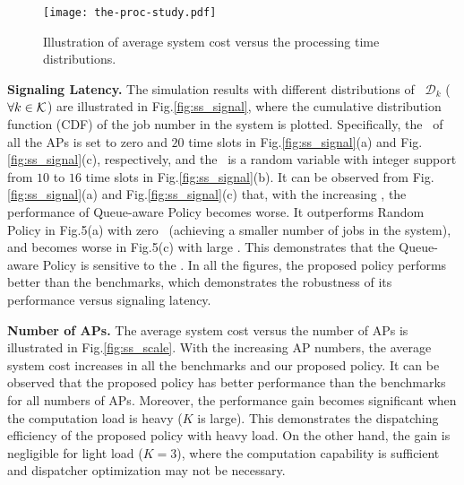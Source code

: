 \begin{figure}[hbt]                                                 %
    \centering                                                      %
    \texttt{[image: the-proc-study.pdf]}      %
    \caption{Illustration of average system cost versus the processing time distributions.}
    \label{fig:ss_dist}                                             %
\end{figure}                                                        %


\textbf{Signaling Latency.}
The simulation results with different distributions of \brlatency~$\mathcal{D}_{k}$ ($\forall k\in\mathcal{K}$) are illustrated in Fig.\ref{fig:ss_signal}, where the cumulative distribution function (CDF) of the job number in the system is plotted.
Specifically, the \brlatency~of all the APs is set to zero and $20$ time slots in Fig.\ref{fig:ss_signal}(a) and Fig.\ref{fig:ss_signal}(c), respectively, and the \brlatency~is a random variable with integer support from $10$ to $16$ time slots in Fig.\ref{fig:ss_signal}(b).
It can be observed from Fig.\ref{fig:ss_signal}(a) and Fig.\ref{fig:ss_signal}(c) that, with the increasing \brlatency, the performance of Queue-aware Policy becomes worse.
It outperforms Random Policy in Fig.5(a) with zero \brlatency~(achieving a smaller number of jobs in the system), and becomes worse in Fig.5(c) with large \brlatency.
This demonstrates that the Queue-aware Policy is sensitive to the \brlatency.
In all the figures, the proposed policy performs better than the benchmarks, which demonstrates the robustness of its performance versus signaling latency.

\textbf{Number of APs.} %
The average system cost versus the number of APs is illustrated in Fig.\ref{fig:ss_scale}.
With the increasing AP numbers, the average system cost increases in all the benchmarks and our proposed policy.
It can be observed that the proposed policy has better performance than the benchmarks for all numbers of APs.
Moreover, the performance gain becomes significant when the computation load is heavy ($K$ is large).
This demonstrates the dispatching efficiency of the proposed policy with heavy load.
On the other hand, the gain is negligible for light load ($K=3$), where the computation capability is sufficient and dispatcher optimization may not be necessary.

